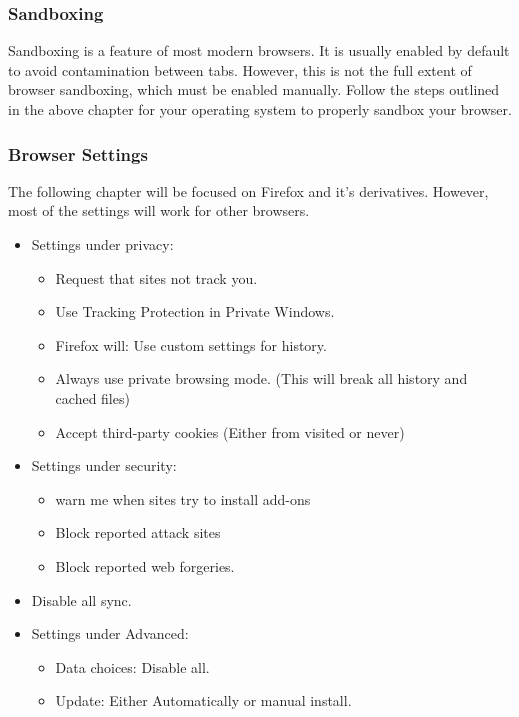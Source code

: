 \documentclass[a4paper,11pt]{report}
\begin{document}
		\subsubsection{Sandboxing}
			Sandboxing is a feature of most modern browsers. It is usually enabled by default to avoid contamination between tabs. 
			However, this is not the full extent of browser sandboxing, which must be enabled manually. 
			Follow the steps outlined in the above chapter for your operating system to properly sandbox your browser. 
		\subsubsection{Browser Settings}
			The following chapter will be focused on Firefox and it's derivatives. 
			However, most of the settings will work for other browsers. 
			\begin{itemize}
				\item Settings under privacy:
					\begin{itemize}
						\item Request that sites not track you. 
						\item Use Tracking Protection in Private Windows. 
						\item Firefox will: Use custom settings for history. 
						\item Always use private browsing mode. (This will break all history and cached files) 
						\item Accept third-party cookies (Either from visited or never)
					\end{itemize}
				\item Settings under security:
					\begin{itemize}
						\item warn me when sites try to install add-ons
						\item Block reported attack sites
						\item Block reported web forgeries. 
					\end{itemize}
				\item Disable all sync. 
				\item Settings under Advanced:
					\begin{itemize}
						\item Data choices: Disable all.
						\item Update: Either Automatically or manual install. 
					\end{itemize}
			\end{itemize}
\end{document}
